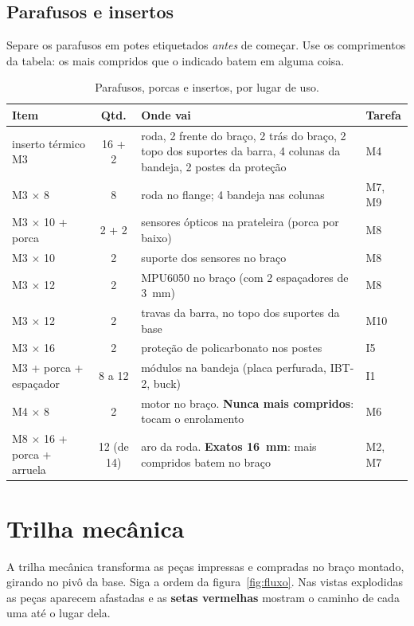 \documentclass[11pt,a4paper]{article}
\begin{document}
\subsection{Parafusos e insertos}

Separe os parafusos em potes etiquetados \emph{antes} de começar. Use os comprimentos da
tabela: os mais compridos que o indicado batem em alguma coisa.

\begin{table}[H]
\centering\small
\caption{Parafusos, porcas e insertos, por lugar de uso.}
\label{tab:parafusos}
\begin{tabularx}{\textwidth}{@{}lc>{\raggedright\arraybackslash}Xl@{}}
\toprule
Item & Qtd. & Onde vai & Tarefa \\
\midrule
inserto térmico M3 & 16 + 2 & 4 roda, 2 frente do braço, 2 trás do braço, 2 topo dos
  suportes da barra, 4 colunas da bandeja, 2 postes da proteção & M4 \\
M3 $\times$ 8 & 8 & 4 roda no flange; 4 bandeja nas colunas & M7, M9 \\
M3 $\times$ 10 + porca & 2 + 2 & sensores ópticos na prateleira (porca por baixo) & M8 \\
M3 $\times$ 10 & 2 & suporte dos sensores no braço & M8 \\
M3 $\times$ 12 & 2 & MPU6050 no braço (com 2 espaçadores de 3~mm) & M8 \\
M3 $\times$ 12 & 2 & travas da barra, no topo dos suportes da base & M10 \\
M3 $\times$ 16 & 2 & proteção de policarbonato nos postes & I5 \\
M3 + porca + espaçador & 8 a 12 & módulos na bandeja (placa perfurada, IBT-2, buck) & I1 \\
M4 $\times$ 8 & 2 & motor no braço. \textbf{Nunca mais compridos}: tocam o enrolamento & M6 \\
M8 $\times$ 16 + porca + arruela & 12 (de 14) & aro da roda. \textbf{Exatos 16~mm}: mais
  compridos batem no braço & M2, M7 \\
\bottomrule
\end{tabularx}
\end{table}

\section{Trilha mecânica}
\label{sec:mecanica}

A trilha mecânica transforma as peças impressas e compradas no braço montado, girando no
pivô da base. Siga a ordem da figura~\ref{fig:fluxo}. Nas vistas explodidas as peças
aparecem afastadas e as \textbf{setas vermelhas} mostram o caminho de cada uma até o
lugar dela.
\end{document}
